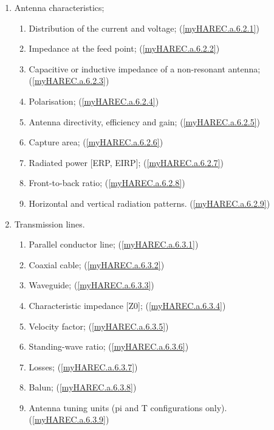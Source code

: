 \begin{enumerate}
\begin{enumerate}
\item Antenna characteristics;
\begin{enumerate}
\item Distribution of the current and voltage;
  (\ref{myHAREC.a.6.2.1})\label{HAREC.a.6.2.1}
\item Impedance at the feed point;
  (\ref{myHAREC.a.6.2.2})\label{HAREC.a.6.2.2}
\item Capacitive or inductive impedance of a non-resonant antenna;
  (\ref{myHAREC.a.6.2.3})\label{HAREC.a.6.2.3}
\item Polarisation; (\ref{myHAREC.a.6.2.4})\label{HAREC.a.6.2.4}
\item Antenna directivity, efficiency and gain;
  (\ref{myHAREC.a.6.2.5})\label{HAREC.a.6.2.5}
\item Capture area; (\ref{myHAREC.a.6.2.6})\label{HAREC.a.6.2.6}
\item Radiated power [ERP, EIRP]; (\ref{myHAREC.a.6.2.7})\label{HAREC.a.6.2.7}
\item Front-to-back ratio; (\ref{myHAREC.a.6.2.8})\label{HAREC.a.6.2.8}
\item Horizontal and vertical radiation patterns.
  (\ref{myHAREC.a.6.2.9})\label{HAREC.a.6.2.9}
\end{enumerate}

\item Transmission lines.
\begin{enumerate}
\item Parallel conductor line; (\ref{myHAREC.a.6.3.1})\label{HAREC.a.6.3.1}
\item Coaxial cable; (\ref{myHAREC.a.6.3.2})\label{HAREC.a.6.3.2}
\item Waveguide; (\ref{myHAREC.a.6.3.3})\label{HAREC.a.6.3.3}
\item Characteristic impedance [Z0];
  (\ref{myHAREC.a.6.3.4})\label{HAREC.a.6.3.4}
\item Velocity factor; (\ref{myHAREC.a.6.3.5})\label{HAREC.a.6.3.5}
\item Standing-wave ratio; (\ref{myHAREC.a.6.3.6})\label{HAREC.a.6.3.6}
\item Losses; (\ref{myHAREC.a.6.3.7})\label{HAREC.a.6.3.7}
\item Balun; (\ref{myHAREC.a.6.3.8})\label{HAREC.a.6.3.8}
\item Antenna tuning units (pi and T configurations only).
  (\ref{myHAREC.a.6.3.9})\label{HAREC.a.6.3.9}
\end{enumerate}
\end{enumerate}


\end{enumerate}
